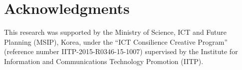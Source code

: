 \documentclass[letterpaper]{article} %
\begin{document}
		\section{Acknowledgments}
		This research was supported by the Ministry of Science, ICT and Future Planning (MSIP), Korea, under the “ICT Consilience Creative Program” (reference number IITP-2015-R0346-15-1007) supervised by the Institute for Information and Communications Technology Promotion (IITP).
		
		\fontsize{9.0pt}{10.0pt}
		\selectfont
		
		
		
	
\end{document}
